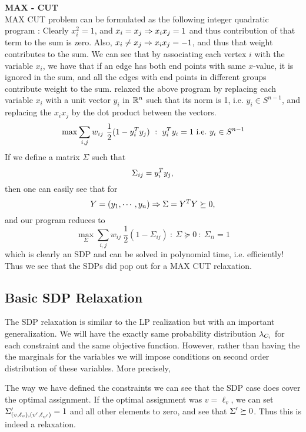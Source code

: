 \begin{example}{\bf MAX - CUT}\label{maxcut}\\
MAX CUT problem can be formulated as the following integer quadratic program : 
Clearly $x_i^2=1$, and $x_i=x_j\Rightarrow x_ix_j=1$ and thus contribution of that term to the sum is zero. 
Also, $x_i \neq x_j \Rightarrow x_ix_j=-1$, and thus that weight contributes to the sum. 
We can see that by associating each vertex $i$ with the variable $x_i$, we have that if an edge has both end points with same $x$-value, it is ignored in the sum, and all the edges with end points in different groups contribute weight to the sum. 
\cite{delormecombinatorial} relaxed the above program by replacing each variable $x_i$ with a unit vector $y_i$ in $\mathbb{R}^n$ such that its norm is 1, i.e. $y_i \in S^{n-1}$, and replacing the $x_ix_j$ by the dot product between the vectors. 
\[ \max \sum_{i,j} w_{ij} \ \frac{1}{2}(1-y_i^T y_j) ~:~ y_i^T y_i = 1 {\mbox {\ i.e.\ }} y_i \in S^{n-1} \]
If we define a matrix $\Sigma$ such that $$\Sigma_{ij} = y_i^T y_j,$$ then one can easily see that for $$Y = (y_1, \cdots, y_n) \Rightarrow \Sigma = Y^T Y \succeq 0,$$ and our program reduces to 
\[ \max_\Sigma \sum_{i,j} w_{ij} \ \frac{1}{2}(1-\Sigma_{ij}) ~:~ \Sigma \succeq 0 ~:~ \Sigma_{ii} = 1  \]
which is clearly an SDP and can be solved in polynomial time, i.e. efficiently! 
Thus we see that the SDPs did pop out for a MAX CUT relaxation.
\end{example}

\subsection{Basic SDP Relaxation}

The SDP relaxation is similar to the LP realization but with an important generalization. 
We will have the exactly same probability distribution $\lambda_{C_i}$ for each constraint and the same objective function. 
However, rather than having the the marginals for the variables we will impose conditions on second order distribution of these variables. 
More precisely,

The way we have defined the constraints we can see that the SDP case does cover the optimal assignment. 
If the optimal assignment was $v=\ell_v$, we can set $ \Sigma'_{\left(v, \ell_v\right),\left(v', \ell_{v'}\right)} = 1$ and all other elements to zero, and see that $\Sigma' \succeq 0$. 
Thus this is indeed a relaxation.


